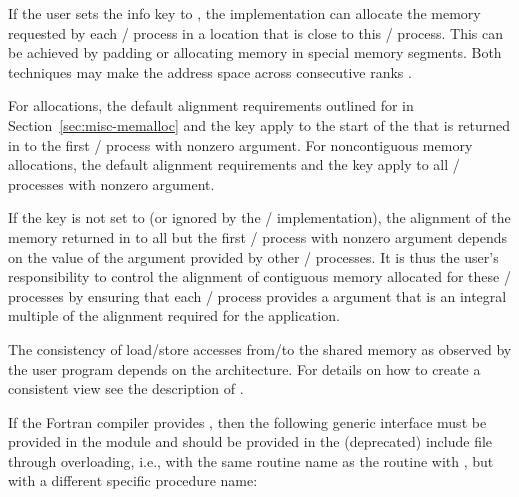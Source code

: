 \begin{implementors}
If the user sets the info key  to , the
implementation can allocate the memory requested by each \mpi/ process in a
location that is close to this \mpi/ process. This can be achieved by padding
or allocating memory in special memory segments. Both techniques may
make the address space across consecutive ranks .
\end{implementors}

For  allocations, the default alignment requirements outlined
for  in Section~\ref{sec:misc-memalloc} and the
  key apply to the start
of the  that is returned in  to the first \mpi/ process
with nonzero  argument. For noncontiguous memory allocations,
the default alignment requirements and the 
 key apply to all \mpi/ processes with nonzero  argument.

\begin{users}
If the  key  is not set to  (or ignored by the \MPI/
implementation), the alignment of the memory returned in  to all but
the first \mpi/ process with nonzero  argument depends on the value of the  argument
provided by other \mpi/ processes.
It is thus the user's responsibility to control the alignment of contiguous memory allocated for these \mpi/ processes
by ensuring that each \mpi/ process provides a  argument that is an integral multiple of the alignment
required for the application.
\end{users}

The consistency of load/store accesses from/to the shared memory as
observed by the user program depends on the architecture.
For details on how to create a consistent view see the description of .

 
If the Fortran compiler provides , 
then the following generic interface must be provided in the 
module and should be provided in the (deprecated)  include file through overloading, 
i.e., with the same routine name as the
routine with  , 
but with a different specific procedure name:
 

